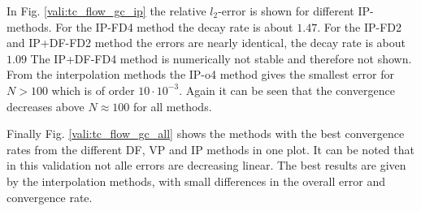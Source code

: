 In Fig. \ref{vali:tc_flow_gc_ip} the relative $l_2$-error is shown for different IP-methods.
For the IP-FD4 method the decay rate is about $1.47$.
For the IP-FD2 and IP+DF-FD2 method the errors are nearly  identical, the decay rate is about $1.09$
The IP+DF-FD4 method is numerically not stable and therefore not shown.
From the interpolation methods the IP-o4 method gives the smallest error for $N>100$ which is of order $10 \cdot 10^{-3}$.
Again it can be seen that the convergence decreases above $N\approx100$ for all methods.

Finally Fig. \ref{vali:tc_flow_gc_all} shows the methods  with the best convergence
rates from the different DF, VP and IP methods in one plot.
It can be noted that in this validation not alle errors are decreasing linear.
The best results are given by the interpolation methods, with small differences in the overall error
and convergence rate.


